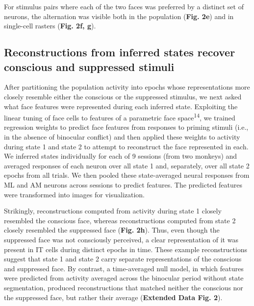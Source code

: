 \documentclass{article}
\begin{document}
For stimulus pairs where each of the two faces was preferred by a distinct set of neurons, the alternation was visible both in the population (\textbf{Fig. 2e}) and in single-cell rasters (\textbf{Fig. 2f, g}).

\subsection*{Reconstructions from inferred states recover conscious and suppressed stimuli}

After partitioning the population activity into epochs whose representations more closely resemble either the conscious or the suppressed stimulus, we next asked what face features were represented during each inferred state. Exploiting the linear tuning of face cells to features of a parametric face space\textsuperscript{14}, we trained regression weights to predict face features from responses to priming stimuli (i.e., in the absence of binocular conflict) and then applied these weights to activity during state 1 and state 2 to attempt to reconstruct the face represented in each. We inferred states individually for each of 9 sessions (from two monkeys) and averaged responses of each neuron over all state 1 and, separately, over all state 2 epochs from all trials. We then pooled these state-averaged neural responses from ML and AM neurons across sessions to predict features. The predicted features were transformed into images for visualization.

Strikingly, reconstructions computed from activity during state 1 closely resembled the conscious face, whereas reconstructions computed from state 2 closely resembled the suppressed face (\textbf{Fig. 2h}). Thus, even though the suppressed face was not consciously perceived, a clear representation of it was present in IT cells during distinct epochs in time. These example reconstructions suggest that state 1 and state 2 carry separate representations of the conscious and suppressed face. By contrast, a time-averaged null model, in which features were predicted from activity averaged across the binocular period without state segmentation, produced reconstructions that matched neither the conscious nor the suppressed face, but rather their average (\textbf{Extended Data Fig. 2}).
\end{document}
